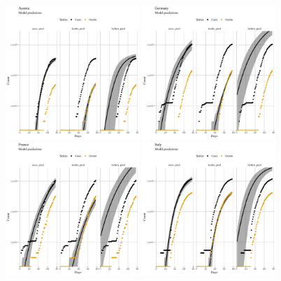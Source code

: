 \documentclass[a4paper]{tufte-handout}
\begin{document}
\begin{figure}
  \begin{center}
    \includegraphics[width=0.45\textwidth]{../figs/model_pred_Gomp_AUT.pdf}
    \includegraphics[width=0.45\textwidth]{../figs/model_pred_Gomp_DEU.pdf}
    \includegraphics[width=0.45\textwidth]{../figs/model_pred_Gomp_FRA.pdf}
    \includegraphics[width=0.45\textwidth]{../figs/model_pred_Gomp_ITA.pdf}

\end{center}
\end{figure}
\end{document}
